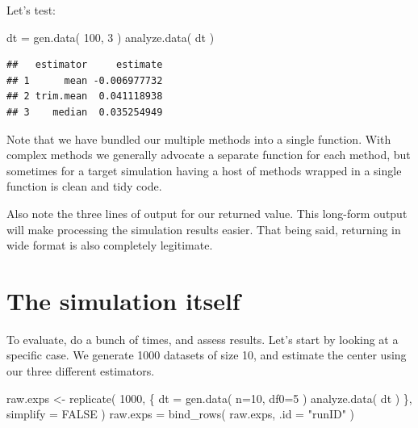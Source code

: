 \documentclass[
]{book}
\newenvironment{Shaded}{\begin{snugshade}}{\end{snugshade}}
\newcommand{\AttributeTok}[1]{\textcolor[rgb]{0.77,0.63,0.00}{#1}}
\newcommand{\ConstantTok}[1]{\textcolor[rgb]{0.00,0.00,0.00}{#1}}
\newcommand{\DecValTok}[1]{\textcolor[rgb]{0.00,0.00,0.81}{#1}}
\newcommand{\FunctionTok}[1]{\textcolor[rgb]{0.00,0.00,0.00}{#1}}
\newcommand{\NormalTok}[1]{#1}
\newcommand{\OtherTok}[1]{\textcolor[rgb]{0.56,0.35,0.01}{#1}}
\newcommand{\StringTok}[1]{\textcolor[rgb]{0.31,0.60,0.02}{#1}}
\begin{document}
Let's test:

\begin{Shaded}
\begin{Highlighting}[]
\NormalTok{dt }\OtherTok{=} \FunctionTok{gen.data}\NormalTok{( }\DecValTok{100}\NormalTok{, }\DecValTok{3}\NormalTok{ )}
\FunctionTok{analyze.data}\NormalTok{( dt )}
\end{Highlighting}
\end{Shaded}

\begin{verbatim}
##   estimator     estimate
## 1      mean -0.006977732
## 2 trim.mean  0.041118938
## 3    median  0.035254949
\end{verbatim}

Note that we have bundled our multiple methods into a single function.
With complex methods we generally advocate a separate function for each method, but sometimes for a target simulation having a host of methods wrapped in a single function is clean and tidy code.

Also note the three lines of output for our returned value.
This long-form output will make processing the simulation results easier.
That being said, returning in wide format is also completely legitimate.

\hypertarget{the-simulation-itself}{%
\section{The simulation itself}\label{the-simulation-itself}}

To evaluate, do a bunch of times, and assess results. Let's start by looking
at a specific case. We generate 1000 datasets of size 10, and estimate the
center using our three different estimators.

\begin{Shaded}
\begin{Highlighting}[]
\NormalTok{raw.exps }\OtherTok{\textless{}{-}} \FunctionTok{replicate}\NormalTok{( }\DecValTok{1000}\NormalTok{, \{}
\NormalTok{    dt }\OtherTok{=} \FunctionTok{gen.data}\NormalTok{( }\AttributeTok{n=}\DecValTok{10}\NormalTok{, }\AttributeTok{df0=}\DecValTok{5}\NormalTok{ )}
    \FunctionTok{analyze.data}\NormalTok{( dt )}
\NormalTok{\}, }\AttributeTok{simplify =} \ConstantTok{FALSE}\NormalTok{ )}
\NormalTok{raw.exps }\OtherTok{=} \FunctionTok{bind\_rows}\NormalTok{( raw.exps, }\AttributeTok{.id =} \StringTok{"runID"}\NormalTok{ )}
\end{Highlighting}
\end{Shaded}
\end{document}

